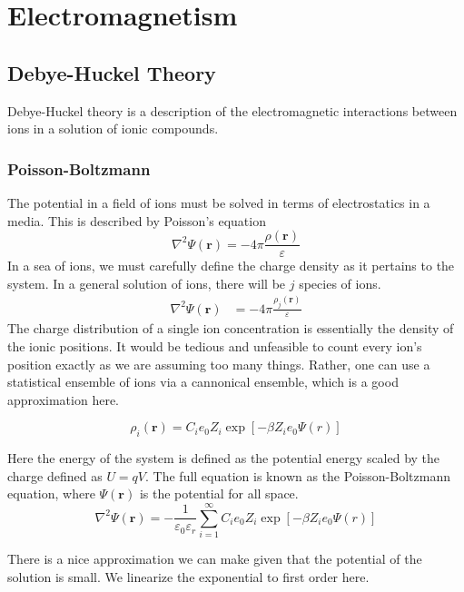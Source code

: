 \chapter{Electromagnetism}
\section{Debye-Huckel Theory}

Debye-Huckel theory is a description of the electromagnetic interactions between ions in a solution of ionic compounds.

\subsection{Poisson-Boltzmann}

The potential in a field of ions must be solved in terms of electrostatics in a media. This is described by Poisson's equation
\begin{equation}
    \nabla^2 \Psi(\mathbf{r}) = -4 \pi \frac{\rho(\mathbf{r})}{\varepsilon}
\end{equation}
In a sea of ions, we must carefully define the charge density as it pertains to the system. In a general solution of ions, there will be $j$ species of ions.
\begin{align*}
    \nabla^2 \Psi(\mathbf{r}) &=- 4 \pi \frac{\rho_j(\mathbf{r})}{\varepsilon}
\end{align*}
The charge distribution of a single ion concentration is essentially the density of the ionic positions. It would be tedious and unfeasible to count every ion's position exactly as we are assuming too many things. Rather, one can use a statistical ensemble of ions via a cannonical ensemble, which is a good approximation here.

\begin{equation}
    \rho_i(\mathbf{r}) = C_i e_0 Z_i \exp{\left[-\beta Z_i e_0\Psi(r)\right]}
\end{equation}

Here the energy of the system is defined as the potential energy scaled by the charge defined as $U = qV$. The full equation is known as the Poisson-Boltzmann equation, where $\Psi(\mathbf{r})$ is the potential for all space.
\begin{equation}
    \nabla^2 \Psi(\mathbf{r}) = -\frac{1}{\varepsilon_0 \varepsilon_r}\sum_{i =1}^\infty C_i e_0 Z_i \exp{\left[-\beta Z_i e_0\Psi(r)\right]}
\end{equation}

There is a nice approximation we can make given that the potential of the solution is small. We linearize the exponential to first order here.

